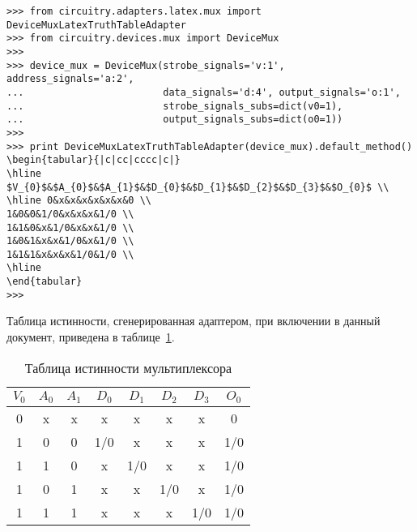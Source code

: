 \documentclass[document.tex]{subfiles}
\begin{document}
\begin{listing}[ht]
\begin{verbatim}
>>> from circuitry.adapters.latex.mux import DeviceMuxLatexTruthTableAdapter        
>>> from circuitry.devices.mux import DeviceMux                             
>>> 
>>> device_mux = DeviceMux(strobe_signals='v:1', address_signals='a:2',
...                        data_signals='d:4', output_signals='o:1',
...                        strobe_signals_subs=dict(v0=1),
...                        output_signals_subs=dict(o0=1))
>>> 
>>> print DeviceMuxLatexTruthTableAdapter(device_mux).default_method()
\begin{tabular}{|c|cc|cccc|c|}
\hline
$V_{0}$&$A_{0}$&$A_{1}$&$D_{0}$&$D_{1}$&$D_{2}$&$D_{3}$&$O_{0}$ \\
\hline 0&x&x&x&x&x&x&0 \\
1&0&0&1/0&x&x&x&1/0 \\
1&1&0&x&1/0&x&x&1/0 \\
1&0&1&x&x&1/0&x&1/0 \\
1&1&1&x&x&x&1/0&1/0 \\
\hline 
\end{tabular}
>>>
\end{verbatim}
\caption{Генерация кода \LaTeX}
\label{lst:muxlatexgen}
\end{listing}

Таблица истинности, сгенерированная адаптером, при включении в данный документ,
приведена в таблице~\ref{table:truth_table}.


\begin{table}[h]
\centering
\begin{tabular}{|c|cc|cccc|c|}
\hline
$V_{0}$&$A_{0}$&$A_{1}$&$D_{0}$&$D_{1}$&$D_{2}$&$D_{3}$&$O_{0}$ \\
\hline 0&x&x&x&x&x&x&0 \\
1&0&0&1/0&x&x&x&1/0 \\
1&1&0&x&1/0&x&x&1/0 \\
1&0&1&x&x&1/0&x&1/0 \\
1&1&1&x&x&x&1/0&1/0 \\
\hline 
\end{tabular}
\caption{Таблица истинности мультиплексора}
\label{table:truth_table}
\end{table}
\end{document}
